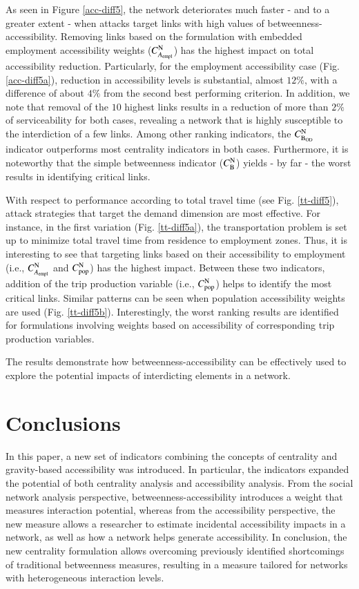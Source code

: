 \documentclass[]{elsarticle} %
\begin{document}
As seen in Figure \ref{acc-diff5}, the network deteriorates much faster
- and to a greater extent - when attacks target links with high values
of betweenness-accessibility. Removing links based on the formulation
with embedded employment accessibility weights
(\(C_{A_{\rm empl}}^{\rm N}\)) has the highest impact on total
accessibility reduction. Particularly, for the employment accessibility
case (Fig. \ref{acc-diff5a}), reduction in accessibility levels is
substantial, almost \(12\%\), with a difference of about \(4\%\) from
the second best performing criterion. In addition, we note that removal
of the \(10\) highest links results in a reduction of more than \(2\%\)
of serviceability for both cases, revealing a network that is highly
susceptible to the interdiction of a few links. Among other ranking
indicators, the \(C_{\rm B_{OD}}^{\rm N}\) indicator outperforms most
centrality indicators in both cases. Furthermore, it is noteworthy that
the simple betweenness indicator (\(C_{\rm B}^{\rm N}\)) yields - by far
- the worst results in identifying critical links.

With respect to performance according to total travel time (see Fig.
\ref{tt-diff5}), attack strategies that target the demand dimension are
most effective. For instance, in the first variation (Fig.
\ref{tt-diff5a}), the transportation problem is set up to minimize total
travel time from residence to employment zones. Thus, it is interesting
to see that targeting links based on their accessibility to employment
(i.e., \(C_{A_{\rm empl}}^{\rm N}\) and \(C_{\rm pop}^{\rm N}\)) has the
highest impact. Between these two indicators, addition of the trip
production variable (i.e., \(C_{\rm pop}^{\rm N}\)) helps to identify
the most critical links. Similar patterns can be seen when population
accessibility weights are used (Fig. \ref{tt-diff5b}). Interestingly,
the worst ranking results are identified for formulations involving
weights based on accessibility of corresponding trip production
variables.

The results demonstrate how betweenness-accessibility can be effectively
used to explore the potential impacts of interdicting elements in a
network.

\section{Conclusions}\label{conclusions}

In this paper, a new set of indicators combining the concepts of
centrality and gravity-based accessibility was introduced. In
particular, the indicators expanded the potential of both centrality
analysis and accessibility analysis. From the social network analysis
perspective, betweenness-accessibility introduces a weight that measures
interaction potential, whereas from the accessibility perspective, the
new measure allows a researcher to estimate incidental accessibility
impacts in a network, as well as how a network helps generate
accessibility. In conclusion, the new centrality formulation allows
overcoming previously identified shortcomings of traditional betweenness
measures, resulting in a measure tailored for networks with
heterogeneous interaction levels.
\end{document}
